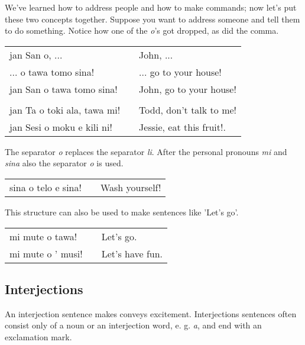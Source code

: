 We've learned how to address people and how to make commands; now let's put these two concepts together.
Suppose you want to address someone and tell them to do something.
Notice how one of the \textit{o}'s got dropped, as did the comma.

\begin{supertabular}{p{5,5cm}|ll}
    jan San o, ...              &  & John, ...                \\ %
    ... o tawa tomo sina!       &  & ... go to your house!    \\ %
    jan San o tawa tomo sina!   &  & John, go to your house!  \\
                                &  &                          \\ %
    jan Ta o toki ala, tawa mi! &  & Todd, don't talk to me!  \\
    jan Sesi o moku e kili ni!  &  & Jessie, eat this fruit!. \\
\end{supertabular}

The separator \textit{o} replaces the separator \textit{li}.
After the personal pronouns \textit{mi} and \textit{sina} also the separator \textit{o} is used.

\begin{supertabular}{p{5,5cm}|ll}
    sina o telo e sina! &  & Wash yourself! \\
\end{supertabular}

This structure can also be used to make sentences like 'Let's go'.

\begin{supertabular}{p{5,5cm}|ll}
    mi mute o tawa!   &  & Let's go.       \\
    mi mute o ' musi! &  & Let's have fun. \\
\end{supertabular}
%
\subsection*{Interjections}
%
%
An interjection sentence makes conveys excitement.
Interjections sentences often consist only of a noun or an interjection word, e. g. \textit{a}, and end with an exclamation mark.


